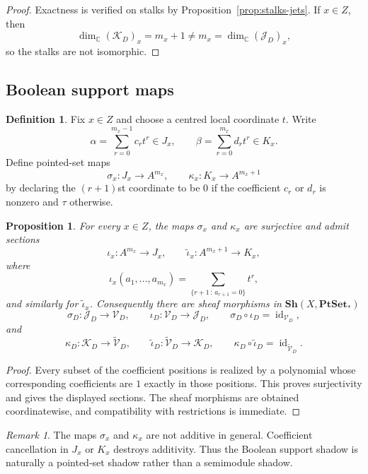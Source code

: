 \documentclass[11pt,a4paper]{article}
\newtheorem{proposition}[theorem]{Proposition}
\theoremstyle{definition}
\newtheorem{definition}[theorem]{Definition}
\theoremstyle{remark}
\newtheorem{remark}[theorem]{Remark}
\DeclareMathOperator{\id}{id}
\newcommand{\CC}{\mathbb C}
\newcommand{\PtSet}{\mathbf{PtSet}_*}
\newcommand{\taup}{\tau}
\newcommand{\Vd}{\mathcal V_D}
\newcommand{\Jd}{\mathcal J_D}
\newcommand{\Kd}{\mathcal K_D}
\newcommand{\Vplusd}{\widetilde{\mathcal V}_D}
\begin{document}
\begin{proof}
Exactness is verified on stalks by Proposition~\ref{prop:stalks-jets}. If $x\in Z$, then
\[
\dim_\CC (\Kd)_x=m_x+1\neq m_x=\dim_\CC(\Jd)_x,
\]
so the stalks are not isomorphic.
\end{proof}

\subsection{Boolean support maps}

\begin{definition}
Fix $x\in Z$ and choose a centred local coordinate $t$.
Write
\[
\alpha=\sum_{r=0}^{m_x-1} c_r t^r\in J_x,
\qquad
\beta=\sum_{r=0}^{m_x} d_r t^r\in K_x.
\]
Define pointed-set maps
\[
\sigma_x:J_x\to A^{m_x},
\qquad
\kappa_x:K_x\to A^{m_x+1}
\]
by declaring the $(r+1)$st coordinate to be $0$ if the coefficient $c_r$ or $d_r$ is nonzero and $\taup$ otherwise.
\end{definition}

\begin{proposition}\label{prop:support-retractions}
For every $x\in Z$, the maps $\sigma_x$ and $\kappa_x$ are surjective and admit sections
\[
\iota_x:A^{m_x}\to J_x,
\qquad
\widetilde\iota_x:A^{m_x+1}\to K_x,
\]
where
\[
\iota_x(a_1,\dots,a_{m_x})=
\sum_{\{r+1\, :\, a_{r+1}=0\}} t^r,
\]
and similarly for $\widetilde\iota_x$. Consequently there are sheaf morphisms in $\mathbf{Sh}(X,\PtSet)$
\[
\sigma_D:\Jd\to\Vd,
\qquad
\iota_D:\Vd\to\Jd,
\qquad
\sigma_D\circ\iota_D=\id_{\Vd},
\]
and
\[
\kappa_D:\Kd\to\Vplusd,
\qquad
\widetilde\iota_D:\Vplusd\to\Kd,
\qquad
\kappa_D\circ\widetilde\iota_D=\id_{\Vplusd}.
\]
\end{proposition}

\begin{proof}
Every subset of the coefficient positions is realized by a polynomial whose corresponding coefficients are $1$ exactly in those positions. This proves surjectivity and gives the displayed sections. The sheaf morphisms are obtained coordinatewise, and compatibility with restrictions is immediate.
\end{proof}

\begin{remark}
The maps $\sigma_x$ and $\kappa_x$ are not additive in general. Coefficient cancellation in $J_x$ or $K_x$ destroys additivity. Thus the Boolean support shadow is naturally a pointed-set shadow rather than a semimodule shadow.
\end{remark}
\end{document}
